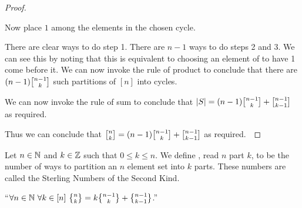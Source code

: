 \begin{proof}
\begin{itemize}
\begin{itemize}
\begin{enumerate}
                                    Now place $1$ among the elements in the chosen cycle.
                            \end{enumerate}
                            There are clear  ways to do step 1. There
                            are $n - 1$ ways to do steps 2 and 3. We can see this by noting
                            that this is equivalent to choosing an element of 
                            to have 1 come before it. We can now invoke the rule of product
                            to conclude that there are $(n - 1) \npermk{n - 1}{k}$ such partitions
                            of $[n]$ into cycles.
                    \end{itemize}
                    We can now invoke the rule of sum to conclude that  
                    $|S| = (n - 1) \npermk{n - 1}{k} + \npermk{n - 1}{k - 1}$
                    as required.
            \end{itemize}
            Thus we can conclude that $\npermk{n}{k} = (n - 1) \npermk{n - 1}{k} + \npermk{n - 1}{k - 1}$
            as required.~\QED
        \end{proof}
        \begin{definition}
            Let $n \in \mathbb{N}$ and $k \in \mathbb{Z}$ such that $0 \le k \le n$. We define
            , read $n$ part $k$, to be the number of ways to partition
            an $n$ element set into $k$ parts. These numbers are called the Sterling Numbers
            of the Second Kind.
        \end{definition}
        \begin{theorem}
            ``$\forall n \in \set{N} \ \forall k \in [n] \ \npartk{n}{k} = k \npartk{n - 1}{k} + \npartk{n - 1}{k - 1}$.''
        \end{theorem}
